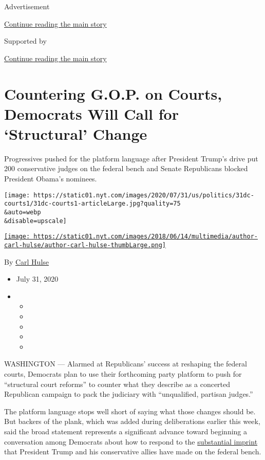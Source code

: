 Advertisement

\protect\hyperlink{after-top}{Continue reading the main story}

Supported by

\protect\hyperlink{after-sponsor}{Continue reading the main story}

\hypertarget{countering-gop-on-courts-democrats-will-call-for-structural-change}{%
\section{Countering G.O.P. on Courts, Democrats Will Call for
`Structural'
Change}\label{countering-gop-on-courts-democrats-will-call-for-structural-change}}

Progressives pushed for the platform language after President Trump's
drive put 200 conservative judges on the federal bench and Senate
Republicans blocked President Obama's nominees.

\texttt{[image: https://static01.nyt.com/images/2020/07/31/us/politics/31dc-courts1/31dc-courts1-articleLarge.jpg?quality=75\\\&auto=webp\\\&disable=upscale]}

\href{https://www.nytimes.com/by/carl-hulse}{\texttt{[image: https://static01.nyt.com/images/2018/06/14/multimedia/author-carl-hulse/author-carl-hulse-thumbLarge.png]}}

By \href{https://www.nytimes.com/by/carl-hulse}{Carl Hulse}

\begin{itemize}
\item
  July 31, 2020
\item
  \begin{itemize}
  \item
  \item
  \item
  \item
  \item
  \end{itemize}
\end{itemize}

WASHINGTON --- Alarmed at Republicans' success at reshaping the federal
courts, Democrats plan to use their forthcoming party platform to push
for ``structural court reforms'' to counter what they describe as a
concerted Republican campaign to pack the judiciary with ``unqualified,
partisan judges.''

The platform language stops well short of saying what those changes
should be. But backers of the plank, which was added during
deliberations earlier this week, said the broad statement represents a
significant advance toward beginning a conversation among Democrats
about how to respond to the
\href{https://www.nytimes.com/2020/06/24/us/trump-senate-judges-wilson.html}{substantial
imprint} that President Trump and his conservative allies have made on
the federal bench.

